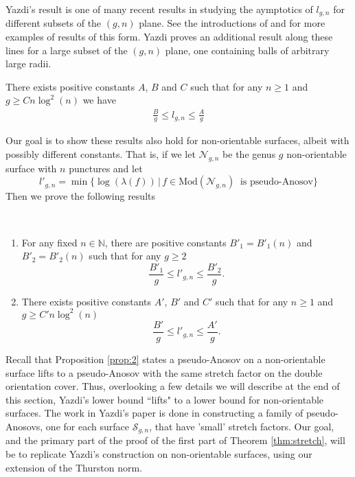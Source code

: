 Yazdi's result is one of many recent results in studying the aymptotics of $l_{g,n}$ for different subsets of the $(g,n)$ plane. See the introductions of \cite{yazdi2018pseudo} and \cite{tsai2009asymptotic} for more examples of results of this form. Yazdi proves an additional result along these lines for a large subset of the $(g,n)$ plane, one containing balls of arbitrary large radii.

\begin{thm}[Yazdi]
    \label{thm:yazdi2}
    There exists positive constants $A$, $B$ and $C$ such that for any $n \geq 1$ and $g \geq Cn\log^2(n)$ we have
    \begin{align*}
        \frac{B}{g} \leq l_{g,n} \leq \frac{A}{g}
    \end{align*}

\end{thm}

Our goal is to show these results also hold for non-orientable surfaces, albeit with possibly different constants. That is, if we let $\mathcal{N}_{g,n}$ be the genus $g$ non-orientable surface with $n$ punctures and let
$$l'_{g,n} = \min\{\log(\lambda(f)) \, \vert \, f \in \text{Mod}(\mathcal{N}_{g,n})\ \text{ is pseudo-Anosov}\}$$
Then we prove the following results
\begin{thm}
\label{thm:stretch}
~\begin{enumerate}
    \item For any fixed $n \in \mathbb{N}$, there are positive constants $B'_1 = B'_1(n)$ and $B'_2 = B'_2(n)$ such that for any $g \geq 2$ $$\frac{B'_1}{g} \leq l'_{g,n} \leq \frac{B'_2}{g}.$$
    \item There exists positive constants $A'$, $B'$ and $C'$ such that for any $n \geq 1$ and $g \geq C'n\log^2(n)$ $$\frac{B'}{g} \leq l'_{g,n} \leq \frac{A'}{g}.$$
\end{enumerate}
\end{thm}

Recall that Proposition \ref{prop:2} states a pseudo-Anosov on a non-orientable surface lifts to a pseudo-Anosov with the same stretch factor on the double orientation cover. Thus, overlooking a few details we will describe at the end of this section, Yazdi's lower bound ``lifts" to a lower bound for non-orientable surfaces. The work in Yazdi's paper is done in constructing a family of pseudo-Anosovs, one for each surface $\mathcal{S}_{g,n}$, that have 'small' stretch factors. Our goal, and the primary part of the proof of the first part of Theorem \ref{thm:stretch}, will be to replicate Yazdi's construction on non-orientable surfaces, using our extension of the Thurston norm.

